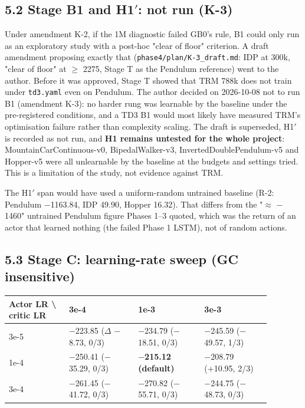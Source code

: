 \documentclass[11pt]{article}
\begin{document}
\subsection*{5.2 Stage B1 and H1$'$: not run (K-3)}



Under amendment K-2, if the 1M diagnostic failed GB0's rule, B1 could only run as an exploratory study with a post-hoc "clear of floor" criterion. A draft amendment proposing exactly that (\texttt{phase4/\allowbreak{}plan/\allowbreak{}K-3\_\allowbreak{}draft.\allowbreak{}md}: IDP at 300k, "clear of floor" at $\geq$ 2275, Stage T as the Pendulum reference) went to the author. Before it was approved, Stage T showed that TRM 788k does not train under \texttt{td3.yaml} even on Pendulum. The author decided on 2026-10-08 not to run B1 (amendment K-3): no harder rung was learnable by the baseline under the pre-registered conditions, and a TD3 B1 would most likely have measured TRM's optimisation failure rather than complexity scaling. The draft is superseded, H1$'$ is recorded as not run, and \textbf{H1 remains untested for the whole project}: MountainCarContinuous-v0, BipedalWalker-v3, InvertedDoublePendulum-v5 and Hopper-v5 were all unlearnable by the baseline at the budgets and settings tried. This is a limitation of the study, not evidence against TRM.



The H1$'$ span would have used a uniform-random untrained baseline (R-2: Pendulum $-$1163.84, IDP 49.90, Hopper 16.32). That differs from the "$\approx$ $-$1460" untrained Pendulum figure Phases 1--3 quoted, which was the return of an actor that learned nothing (the failed Phase 1 LSTM), not of random actions.



\subsection*{5.3 Stage C: learning-rate sweep (GC insensitive)}



\begin{center}\small\begin{tabular}{>{\raggedright\arraybackslash}p{0.209\linewidth}>{\raggedleft\arraybackslash}p{0.230\linewidth}>{\raggedleft\arraybackslash}p{0.220\linewidth}>{\raggedleft\arraybackslash}p{0.220\linewidth}}
\toprule
Actor LR \textbackslash{} critic LR & 3e-4 & 1e-3 & 3e-3 \\
\midrule
3e-5 & $-$223.85 ($\Delta$ $-$8.73, 0/3) & $-$234.79 ($-$18.51, 0/3) & $-$245.59 ($-$49.57, 1/3) \\
1e-4 & $-$250.41 ($-$35.29, 0/3) & \textbf{$-$215.12 (default)} & $-$208.79 (+10.95, 2/3) \\
3e-4 & $-$261.45 ($-$41.72, 0/3) & $-$270.82 ($-$55.71, 0/3) & $-$244.75 ($-$48.73, 0/3) \\
\bottomrule
\end{tabular}\end{center}
\end{document}
